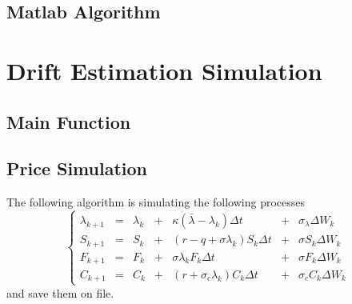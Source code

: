 \documentclass{article}
\theoremstyle{definition}
\theoremstyle{remark}
\begin{document}
\newpage
\subsection{Matlab Algorithm}









\newpage
\section{Drift Estimation Simulation}
\subsection{Main Function}








\subsection{Price Simulation}
The following algorithm is simulating the following processes
\begin{equation*}
\left\{ \begin{array}{lcrcrcr}
			\lambda_{k+1} & = & \lambda_k &+& \kappa(\bar{\lambda}-\lambda_k)\Delta t & + & \sigma_\lambda \Delta W_k\\
          S_{k+1} & = & S_{k} & + & (r-q+\sigma\lambda_k)S_k \Delta t & + & \sigma S_k \Delta W_k \\ 
          F_{k+1} & = & F_{k} & + & \sigma\lambda_k F_k \Delta t & + & \sigma F_k \Delta  W_k \\ 
          C_{k+1} & = & C_{k} & + & (r+\sigma_c\lambda_k)C_k \Delta t & + & \sigma_c C_k \Delta  W_k 
        \end{array} \right. 
\end{equation*}
and save them on file.

\end{document}
